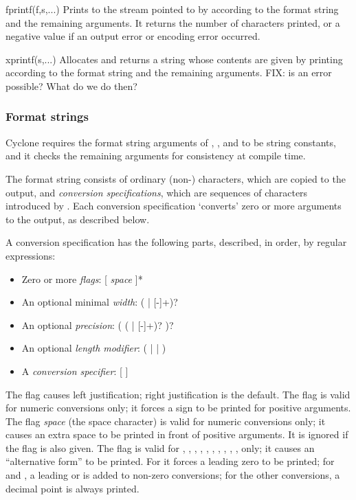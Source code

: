 \begin{defun}{fprintf}{(f,s,...)}
Prints to the stream pointed to by  according to the format
string  and the remaining arguments.  It returns the number of
characters printed, or a negative value if an output error or encoding
error occurred.
\end{defun}

\begin{defun}{xprintf}{(s,...)}
Allocates and returns a string whose contents are given by printing
according to the format string  and the remaining arguments.
FIX: is an error possible?  What do we do then?
\end{defun}

\subsubsection*{Format strings}

Cyclone requires the format string arguments of ,
, and  to be string constants, and it checks
the remaining arguments for consistency at compile time.

The format string consists of ordinary (non-\code{\%}) characters, which
are copied to the output, and \emph{conversion specifications}, which
are sequences of characters introduced by \code{\%}.  Each conversion
specification `converts' zero or more arguments to the output, as
described below.

A conversion specification has the following parts, described, in order,
by regular expressions:
\begin{itemize}
\item Zero or more \emph{flags}:
[\code{-} \code{+} \emph{space} \code{\#} ]*
\item An optional minimal \emph{width}:
(\code{*} | [-]+)?
\item An optional \emph{precision}:
( (\code{*} | [-]+)? )?
\item An optional \emph{length modifier}:
( |  |  )
\item A \emph{conversion specifier}:
[                 \code{\%}]
\end{itemize}

The flag \code{-} causes left justification; right justification is the
default.  The flag \code{+} is valid for numeric conversions only; it
forces a \code{+} sign to be printed for positive arguments.  The flag
\emph{space} (the space character) is valid for numeric conversions only;
it causes an extra space to be printed in front of positive arguments.
It is ignored if the \code{+} flag is also given.
The flag \code{\#} is valid for , , , ,
, , , , , , 
only; it causes an ``alternative form'' to be printed.  For  it
forces a leading zero to be printed; for  and , a
leading  or  is added to non-zero conversions; for the
other conversions, a decimal point is always printed.

